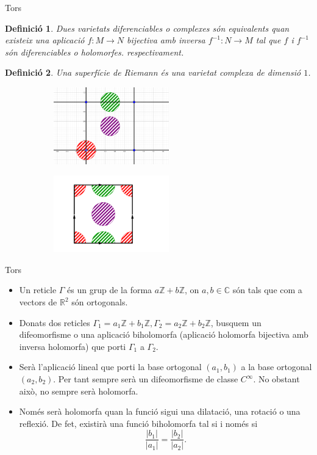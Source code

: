 \documentclass{beamer}
\newtheorem{definicio}{Definici\'{o}}
\theoremstyle{definition}
\begin{document}
\begin{frame}{Tors}
\begin{definicio}
Dues varietats diferenciables o complexes s\'{o}n equivalents quan existeix una aplicaci\'{o} $f:M\rightarrow N$ bijectiva amb inversa $f^{-1}:N\rightarrow M$ tal que $f$ i $f^{-1}$ s\'{o}n diferenciables o holomorfes. respectivament.
\end{definicio}
\pause
\begin{definicio}
Una superf\'{i}cie de Riemann \'{e}s una varietat complexa de dimensi\'{o} $1$.
\end{definicio}
\pause
\begin{figure}[ht!]
\begin{center}
\begin{subfigure}{}
\includegraphics[width=5cm]{Reticle.png} 
\end{subfigure}
\begin{subfigure}{}
\includegraphics[width=5cm]{Quadrat.png} 
\end{subfigure}
\end{center}
\end{figure}
\end{frame}

\begin{frame}{Tors}
\begin{itemize}
\item Un reticle $\Gamma$ \'{e}s un grup de la forma $a\mathbb{Z}+b\mathbb{Z}$, on $a,b\in\mathbb{C}$ s\'{o}n tals que com a vectors de $\mathbb{R}^2$ s\'{o}n ortogonals.
\pause
\item Donats dos reticles $\Gamma_1=a_1\mathbb{Z}+b_1\mathbb{Z},\Gamma_2=a_2\mathbb{Z}+b_2\mathbb{Z}$, busquem un difeomorfisme o una aplicaci\'{o} biholomorfa (aplicaci\'{o} holomorfa bijectiva amb inversa holomorfa) que porti $\Gamma_1$ a $\Gamma_2$.
\pause
\item Ser\`{a} l'aplicaci\'{o} lineal que porti la base ortogonal $(a_1,b_1)$ a la base ortogonal $(a_2,b_2)$. Per tant sempre ser\`{a} un difeomorfisme de classe $C^{\infty}$. No obstant aix\`{o}, no sempre ser\`{a} holomorfa.
\pause
\item Nom\'{e}s ser\`{a} holomorfa quan la funci\'{o} sigui una dilataci\'{o}, una rotaci\'{o} o una reflexi\'{o}. De fet, existir\`{a} una funci\'{o} biholomorfa tal si i nom\'{e}s si
\[\frac{|b_1|}{|a_1|}=\frac{|b_2|}{|a_2|}.\]
\end{itemize}
\end{frame}
\end{document}
